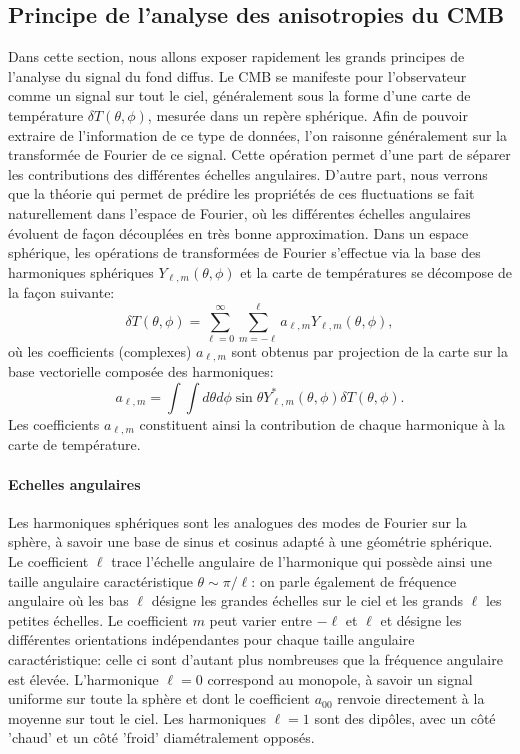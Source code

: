 \subsection{Principe de l'analyse des anisotropies du CMB}
Dans cette section, nous allons exposer rapidement les grands principes de l'analyse du signal du fond diffus. Le CMB se manifeste pour l'observateur comme un signal sur tout le ciel, généralement sous la forme d'une carte de température $\delta T(\theta,\phi)$, mesurée dans un repère sphérique. Afin de pouvoir extraire de l'information de ce type de données, l'on raisonne généralement sur la transformée de Fourier de ce signal. Cette opération permet d'une part de séparer les contributions des différentes échelles angulaires. D'autre part, nous verrons que la théorie qui permet de prédire les propriétés de ces fluctuations se fait naturellement dans l'espace de Fourier, où les différentes échelles angulaires évoluent de façon découplées en très bonne approximation.  Dans un espace sphérique, les opérations de transformées de Fourier s'effectue via la base des harmoniques sphériques $Y_{\ell,m}(\theta,\phi)$ et la carte de températures se décompose de la façon suivante:
\begin{equation}
\delta T(\theta,\phi)= \sum_{\ell=0}^{\infty}\sum_{m=-\ell}^{\ell} a_{\ell,m} Y_{\ell,m}(\theta,\phi),
\end{equation}
où les coefficients (complexes) $a_{\ell,m}$ sont obtenus par projection de la carte sur la base vectorielle composée des harmoniques:
\begin{equation}
a_{\ell,m}=\int \int d\theta d\phi\sin \theta Y^*_{\ell,m}(\theta,\phi) \delta T(\theta,\phi).
\end{equation}
Les coefficients $a_{\ell,m}$ constituent ainsi la contribution de chaque harmonique à la carte de température.

\paragraph{Echelles angulaires}
 Les harmoniques sphériques sont les analogues des modes de Fourier sur la sphère, à savoir une base de sinus et cosinus adapté à une géométrie sphérique. Le coefficient $\ell$ trace l'échelle angulaire de l'harmonique qui possède ainsi une taille angulaire caractéristique $\theta\sim\pi/\ell$: on parle également de fréquence angulaire où les bas $\ell$ désigne les grandes échelles sur le ciel et les grands $\ell$ les petites échelles. Le coefficient $m$ peut varier entre $-\ell$ et $\ell$ et désigne les différentes orientations indépendantes pour chaque taille angulaire caractéristique: celle ci sont d'autant plus nombreuses que la fréquence angulaire est élevée. L'harmonique $\ell=0$ correspond au monopole, à savoir un signal uniforme sur toute la sphère et dont le coefficient $a_{00}$ renvoie directement à la moyenne sur tout le ciel. Les harmoniques $\ell=1$ sont des dipôles, avec un côté 'chaud' et un côté 'froid' diamétralement opposés.


